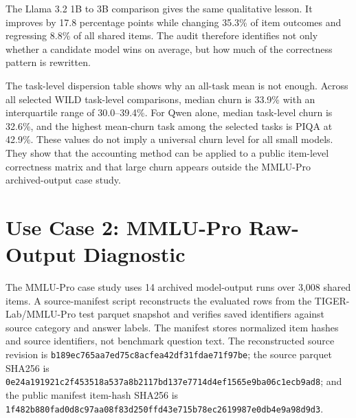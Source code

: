 \documentclass[manuscript, screen, review, nonacm]{jair}
\begin{document}
\begin{table}[t]
\centering
\small
\resizebox{\linewidth}{!}{}
\caption{WILD pooled replacement audits. The table reports selected-task pooled directed comparisons for retained Qwen and Llama model chains. Values are computed from binary correctness records only and do not evaluate raw-response parsing. $I$ is improvement mass, $R$ is regression mass, and NRB is normalized regression burden.}
\label{tab:wild-pairs}
\end{table}

The Llama 3.2 1B to 3B comparison gives the same qualitative lesson. It improves by 17.8 percentage points while changing 35.3\% of item outcomes and regressing 8.8\% of all shared items. The audit therefore identifies not only whether a candidate model wins on average, but how much of the correctness pattern is rewritten.

\begin{table}[t]
\centering
\small
\resizebox{\linewidth}{!}{}
\caption{Task-level dispersion for WILD directed comparisons. The table summarizes the 40 task-level comparisons, separate from the four selected-task pooled comparisons in Table~\ref{tab:wild-pairs}, and reports shared-item denominators.}
\label{tab:wild-task-dispersion}
\end{table}

The task-level dispersion table shows why an all-task mean is not enough. Across all selected WILD task-level comparisons, median churn is 33.9\% with an interquartile range of 30.0--39.4\%. For Qwen alone, median task-level churn is 32.6\%, and the highest mean-churn task among the selected tasks is PIQA at 42.9\%. These values do not imply a universal churn level for all small models. They show that the accounting method can be applied to a public item-level correctness matrix and that large churn appears outside the MMLU-Pro archived-output case study.

\section{Use Case 2: MMLU-Pro Raw-Output Diagnostic}

The MMLU-Pro case study uses 14 archived model-output runs over 3,008 shared items. A source-manifest script reconstructs the evaluated rows from the TIGER-Lab/MMLU-Pro test parquet snapshot and verifies saved identifiers against source category and answer labels. The manifest stores normalized item hashes and source identifiers, not benchmark question text. The reconstructed source revision is \nolinkurl{b189ec765aa7ed75c8acfea42df31fdae71f97be}; the source parquet SHA256 is \nolinkurl{0e24a191921c2f453518a537a8b2117bd137e7714d4ef1565e9ba06c1ecb9ad8}; and the public manifest item-hash SHA256 is \nolinkurl{1f482b880fad0d8c97aa08f83d250ffd43e715b78ec2619987e0db4e9a98d9d3}.
\end{document}
